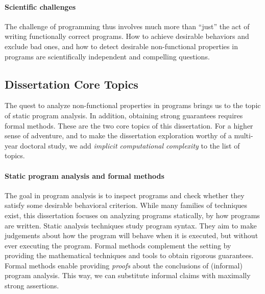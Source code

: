 \paragraph*{Scientific challenges}
The challenge of programming thus involves much more than \enquote{just} the act
of writing functionally correct programs. How to achieve desirable behaviors and
exclude bad ones, and how to detect desirable non-functional properties in
programs are scientifically independent and compelling questions.

\subsection{Dissertation Core Topics}
\label{subsec:dissertation-themes}

The quest to analyze non-functional properties in programs brings us to the
topic of static program analysis. In addition, obtaining strong guarantees
requires formal methods. These are the two core topics of this
dissertation. For a higher sense of adventure, and to make the dissertation
exploration worthy of a multi-year doctoral study, we add \emph{implicit
computational complexity} to the list of topics.

\paragraph*{Static program analysis and formal methods}
The goal in program analysis is to inspect programs and check whether they
satisfy some desirable behavioral criterion. While many families of techniques
exist, this dissertation focuses on analyzing programs statically, \ie by how
programs are written. Static analysis techniques study program syntax. They aim
to make judgements about how the program will behave when it is executed, but
without ever executing the program. Formal methods complement the setting by
providing the mathematical techniques and tools to obtain rigorous guarantees.
Formal methods enable providing \emph{proofs} about the conclusions of
(informal) program analysis. This way, we can substitute informal claims with
maximally strong assertions.


